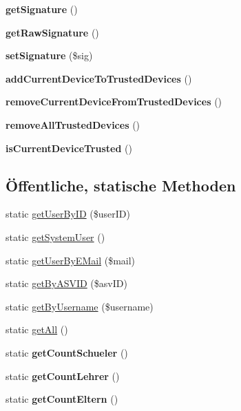 \begin{DoxyCompactItemize}
{\bfseries get\+Signature} ()
\item 
\mbox{\label{classuser_a2115a0e93b91e4bb1ee8e4898c18c396}} 
{\bfseries get\+Raw\+Signature} ()
\item 
\mbox{\label{classuser_a6a7c3b24b5a9566e6259ea2caae8612f}} 
{\bfseries set\+Signature} (\$sig)
\item 
\mbox{\label{classuser_afbae9e849247e90d3ed1bd81c55b3e8b}} 
{\bfseries add\+Current\+Device\+To\+Trusted\+Devices} ()
\item 
\mbox{\label{classuser_a5e9f6eb2c8eb8efd657ddabbf9e6d314}} 
{\bfseries remove\+Current\+Device\+From\+Trusted\+Devices} ()
\item 
\mbox{\label{classuser_a1f507f9d4ef65448d3fa3ef0553e0f0a}} 
{\bfseries remove\+All\+Trusted\+Devices} ()
\item 
\mbox{\label{classuser_aa22fcd853b386cc2643094d9719921d3}} 
{\bfseries is\+Current\+Device\+Trusted} ()
\end{DoxyCompactItemize}
\subsection*{Öffentliche, statische Methoden}
\begin{DoxyCompactItemize}
\item 
static \mbox{\hyperlink{classuser_a1c01d638516435924be8d4fc6de3417f}{get\+User\+By\+ID}} (\$user\+ID)
\item 
static \mbox{\hyperlink{classuser_a5bebc6c83c72242d794bce2da101e9bc}{get\+System\+User}} ()
\item 
static \mbox{\hyperlink{classuser_a59ee10edc17f5878d04f7154aa0df885}{get\+User\+By\+E\+Mail}} (\$mail)
\item 
static \mbox{\hyperlink{classuser_a56717ced4b7e218ab70605f14fc0edda}{get\+By\+A\+S\+V\+ID}} (\$asv\+ID)
\item 
static \mbox{\hyperlink{classuser_a22d9a9cdd45177624c5d0bd471de016d}{get\+By\+Username}} (\$username)
\item 
static \mbox{\hyperlink{classuser_a1c7b8b5395343487460b5a30b2c45b4b}{get\+All}} ()
\item 
\mbox{\label{classuser_acda1c5b95b8bbd23c44ce3cd4914dd2c}} 
static {\bfseries get\+Count\+Schueler} ()
\item 
\mbox{\label{classuser_a3b2e4e768da7cc7d3dfecff745b59991}} 
static {\bfseries get\+Count\+Lehrer} ()
\item 
\mbox{\label{classuser_a911b00223b12ebedaa07f3db76fdd0dc}} 
static {\bfseries get\+Count\+Eltern} ()
\end{DoxyCompactItemize}


